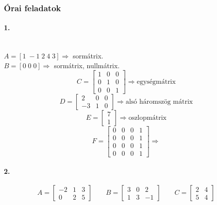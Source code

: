 \documentclass[12pt,a4paper,fleqn]{article}
\newcommand{\myparagraph}[1]{\paragraph{#1}\mbox{}}
\begin{document}
\subsubsection{Órai feladatok}

\myparagraph{1.} \\
$A = [1\;-1\;2\;4\;3] \Rightarrow$ sormátrix. \\
$B = [0\;0\;0] \Rightarrow$ sormátrix, nullmátrix. \\
\[
  C = \begin{bmatrix} 1 & 0 & 0 \\ 0 & 1 & 0 \\ 0 & 0 & 1 \end{bmatrix}
    \Rightarrow \text{egységmátrix}
\]
\[
  D = \begin{bmatrix} 2 & 0 & 0 \\ -3 & 1 & 0 \end{bmatrix}
    \Rightarrow \text{alsó háromszög mátrix}
\]
\[
  E = \begin{bmatrix} 7 \\ 1 \end{bmatrix} \Rightarrow \text{oszlopmátrix}
\]
\[
  F = \begin{bmatrix} 0 & 0 & 0 & 1 \\ 0 & 0 & 0 & 1 \\ 0 & 0 & 0 & 1 \\ 0 & 0 & 0 & 1 \end{bmatrix}
    \Rightarrow \text{} %
\]

\myparagraph{2.}
\[
  A = \begin{bmatrix} -2 & 1 & 3 \\ 0 & 2 & 5 \end{bmatrix} \qquad
  B = \begin{bmatrix} 3 & 0 & 2 \\ 1 & 3 & -1 \end{bmatrix} \qquad
  C = \begin{bmatrix} 2 & 4 \\ 5 & 4 \end{bmatrix}
\]
\end{document}
